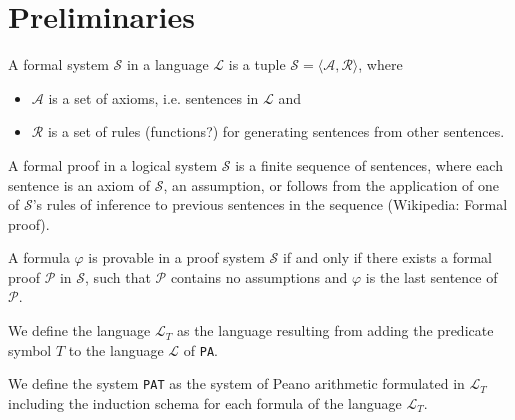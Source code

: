 \chapter{Preliminaries}

\begin{definition}
    A formal system $\mathcal{S}$ in a language $\mathcal{L}$ is a tuple $\mathcal{S} = \langle \mathcal{A}, \mathcal{R} \rangle$, where 
    \begin{itemize}
        \item $\mathcal{A}$ is a set of axioms, i.e. sentences in $\mathcal{L}$ and 
        \item $\mathcal{R}$ is a set of rules (functions?) for generating sentences from other sentences.
    \end{itemize}
\end{definition}

\begin{definition}
    \label{def:formal-proof}
    A formal proof in a logical system $\mathcal{S}$ is a finite sequence of sentences, where each sentence is an axiom of $\mathcal{S}$, an assumption, or follows from the application of one of $\mathcal{S}$'s rules of inference to previous sentences in the sequence (Wikipedia: Formal proof).
\end{definition}

\begin{definition}[provability]
    \label{def:provable-pa}
    A formula $\varphi$ is provable in a proof system $\mathcal{S}$ if and only if there exists a formal proof $\mathcal{P}$ in $\mathcal{S}$, such that $\mathcal{P}$ contains no assumptions and $\varphi$ is the last sentence of $\mathcal{P}$.
\end{definition}

\begin{definition}[$\mathcal{L}_T$]
    \label{def:LT}
    We define the language $\mathcal{L}_T$ as the language resulting from adding the predicate symbol $T$ to the language $\mathcal{L}$ of \texttt{PA}. 
\end{definition}

\begin{definition}
    \label{def:PAT}
    We define the system \texttt{PAT} as the system of Peano arithmetic formulated in $\mathcal{L}_T$ including the induction schema for each formula of the language $\mathcal{L}_T$.
\end{definition}
